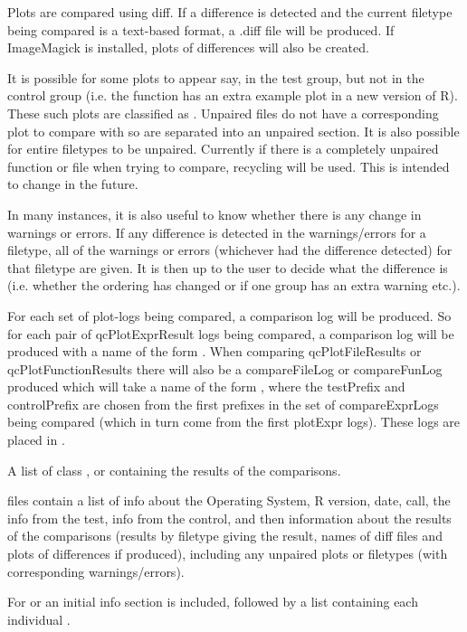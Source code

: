 \documentclass[a4paper,oneside]{report}
\begin{document}
\begin{Details}\relax
Plots are compared using  diff. If a difference is
detected and the current filetype being compared is a text-based
format, a .diff file will be produced. If ImageMagick is installed,
plots of differences will also be created.

It is possible for some plots to appear say, in the test group, but
not in the control group (i.e. the function  has an extra
example plot in a new version of R). These such plots are classified
as . Unpaired files do not have a corresponding plot
to compare with so are separated into an unpaired section. It is also
possible for entire filetypes to be unpaired. Currently if there is a
completely unpaired function or file when trying to compare, recycling
will be used. This is intended to change in the future.

In many instances, it is also useful to know whether there is any
change in warnings or errors. If any difference is detected in the
warnings/errors for a filetype, all of the warnings or errors
(whichever had the difference detected) for that filetype are
given. It is then up to the user to decide what the difference is
(i.e. whether the ordering has changed or if one group has an extra
warning etc.).

For each set of plot-logs being compared, a comparison log will be
produced. So for each pair of qcPlotExprResult logs being compared, a
comparison log will be produced with a name of the form
. When comparing
qcPlotFileResults or qcPlotFunctionResults there will also be a
compareFileLog or compareFunLog produced which will take a name of the form
, where the
testPrefix and controlPrefix are chosen from the first prefixes in the
set of compareExprLogs being compared (which in turn come from the first
plotExpr logs). These logs are placed in .
\end{Details}
\begin{Value}
A list of class ,  or
 containing the results of the comparisons.

 files contain a list of info about the Operating
System, R version, date, call, the info from the test, info from the
control, and then information about the results of the comparisons
(results by filetype giving the result, names of diff files and plots of
differences if produced), including any unpaired plots or filetypes
(with corresponding warnings/errors).

For  or  an initial info
section is included, followed by a list containing each individual
.
\end{Value}
\end{document}
